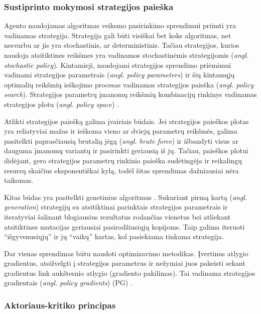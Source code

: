 \documentclass{VUMIFPSbakalaurinis}
\begin{document}
\subsubsection{Sustiprinto mokymosi strategijos paieška}
{
	Agento naudojamas algoritmas veiksmo pasirinkimo sprendimui priimti yra vadinamas strategija. Strategija gali būti visiškai bet koks algoritmas, net nesvarbu ar jis yra stochastinis, ar deterministinis. Tačiau strategijos, kurios naudoja atsitiktines reikšmes yra vadinamos stochastinėmis strategijomis (\textit{angl. stochastic policy}). Kintamieji, naudojami strategijos sprendimo priėmimui vadinami strategijos parametrais (\textit{angl. policy parameters}) ir šių kintamųjų optimalių reikšmių ieškojimo procesas vadinamas strategijos paieška (\textit{angl. policy search}). Strategijos parametrų įmanomų reikšmių kombinacijų rinkinys vadinamas strategijos plotu (\textit{angl. policy space}) \cite{handson}.\par
	
	Atlikti strategijos paiešką galima įvairiais būdais. Jei strategijos paieškos plotas yra reliatyviai mažas ir ieškoma vieno ar dviejų parametrų reikšmės, galima pasitelkti paprasčiausią brutalią jėgą (\textit{angl. brute force}) ir išbandyti visus ar dauguma įmanomų variantų ir pasirinkti geriausią iš jų. Tačiau, paieškos plotui didėjant, gero strategijos parametrų rinkinio paieška sudėtingėja ir reikalingų resursų skaičius eksponentiškai kylą, todėl šitas sprendimas dažniausiai nėra taikomas.\par
	
	Kitas būdas yra pasitelkti genetinius algoritmus \cite{genetic_algorithm_book}. Sukuriant pirmą kartą (\textit{angl. generation}) strategijų su atsitiktinai parinktais strategijos parametrais ir iteratyviai šalinant blogiausius rezultatus rodančias vienetus bei atliekant atsitiktines mutacijas geriausiai pasirodžiusiųjų kopijoms. Taip galima iteruoti \enquote{išgyvenusiųjų} ir jų \enquote{vaikų} kartas, kol pasiekiama tinkama strategija. \par
	
	Dar vienas sprendimas būtu naudoti optimizavimo metodikas. Įvertinus atlygio gradientus, atsižvelgti į strategijos parametrus ir nežymiai juos pakeisti sekant gradientus link aukštesnio atlygio (gradiento pakilimas). Tai vadinama strategijos gradientais (\textit{angl. policy gradients}) (PG) \cite{handson}.
	
}
\subsubsection{Aktoriaus-kritiko principas}
\end{document}
